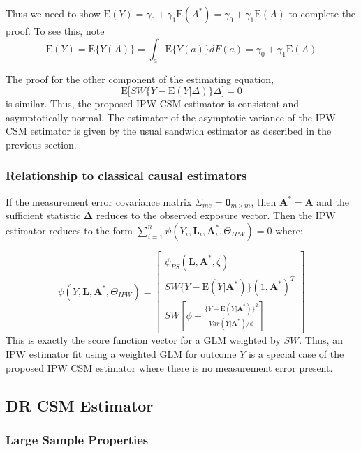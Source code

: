 \documentclass[12pt]{article}
\begin{document}
Thus we need to show $\text{E}(Y) = \gamma_0 + \gamma_1 \text{E}(A^*) = \gamma_0 + \gamma_1 \text{E}(A)$ to complete the proof. To see this, note
\[
\text{E}(Y) = \text{E} \{ Y(A) \} = \int_a \text{E}\{ Y(a) \} dF(a) = \gamma_0 + \gamma_1 \text{E}(A)
\]

The proof for the other component of the estimating equation,
\[
\text{E} \bigg[SW \{ Y - \text{E}(Y | \Delta)\} \Delta \bigg] = 0
\]
is similar. Thus, the proposed IPW CSM estimator is consistent and asymptotically normal. The estimator of the asymptotic variance of the IPW CSM estimator is given by the usual sandwich estimator as described in the previous section.

\subsubsection{Relationship to classical causal estimators}

If the measurement error covariance matrix $\Sigma_{me} = \bm{0}_{m \times m}$, then $\bm{A}^{*} = \bm{A}$ and the sufficient statistic $\bm{\Delta}$ reduces to the observed exposure vector. Then the IPW estimator reduces to the form $\sum_{i=1}^{n} \psi(Y_{i}, \bm{L}_{i}, \bm{A}^{*}_{i}, \Theta_{IPW}) = 0$ where:

\begin{equation*}
    \psi(Y, \bm{L}, \bm{A}^{*}, \Theta_{IPW}) =
    \begin{bmatrix}
      \psi_{PS}(\bm{L}, \bm{A}^{*}, \zeta) \\
       SW\{ Y - \text{E}(Y | \bm{A}^{*}) \} (1, \bm{A}^{*})^{T} \\
       SW \left [ \phi - \frac{ \{Y - \text{E}(Y | \bm{A}^{*}) \}^{2}}{Var(Y | \bm{A}^{*}) / \phi} \right ]
    \end{bmatrix}
\end{equation*}
This is exactly the score function vector for a GLM weighted by $SW$. Thus, an IPW estimator fit using a weighted GLM for outcome $Y$ is a special case of the proposed IPW CSM estimator where there is no measurement error present.

\subsection{DR CSM Estimator}

\subsubsection{Large Sample Properties}
\end{document}
